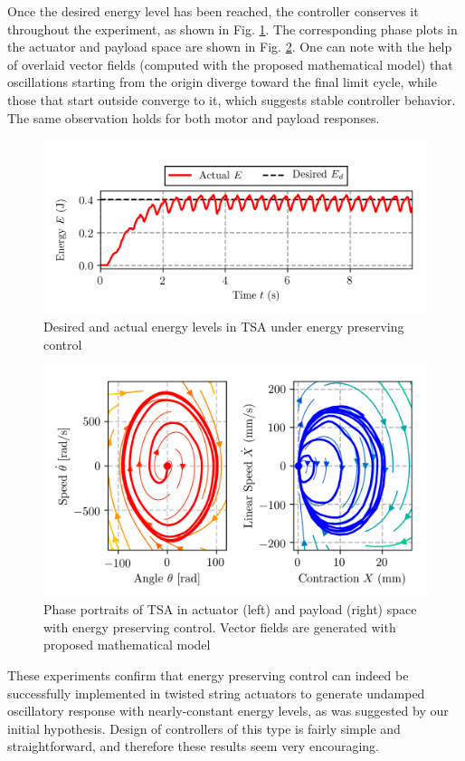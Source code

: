 Once the desired energy level has been reached, the controller conserves it throughout the experiment, as shown in Fig. \ref{fig:energy_levels_EPC}. The corresponding phase plots in the actuator and payload space are shown in Fig. \ref{fig:phase_plot_EPC}. One can note with the help of overlaid vector fields (computed with the proposed mathematical model) that oscillations starting from the origin diverge toward the final limit cycle, while those that start outside converge to it, which suggests stable controller behavior. The same observation holds for both motor and payload responses.
\begin{figure}
		\centering
		\includegraphics[trim= 0.0cm 1.0cm 0.0cm 0.0cm,width=1.0\columnwidth]{pics/plots/energy_convergence.png}
		\caption{Desired and actual energy levels in TSA under energy preserving control}
 		\label{fig:energy_levels_EPC}
		\vspace*{-2mm} 
\end{figure}

\begin{figure}
		\centering
		\includegraphics[trim= 0.0cm 0.8cm 0.0cm 0.0cm,width=1.0\columnwidth]{pics/plots/phase_space_control.png}
		\caption{Phase portraits of TSA in actuator (left) and payload (right) space with energy preserving control. Vector fields are generated with proposed mathematical model}
 		\label{fig:phase_plot_EPC}
		\vspace*{-2mm} 
\end{figure}

These experiments confirm that energy preserving control can indeed be successfully implemented in twisted string actuators to generate undamped oscillatory response with nearly-constant energy levels, as was suggested by our initial hypothesis. Design of controllers of this type is fairly simple and straightforward, and therefore these results seem very encouraging. 

